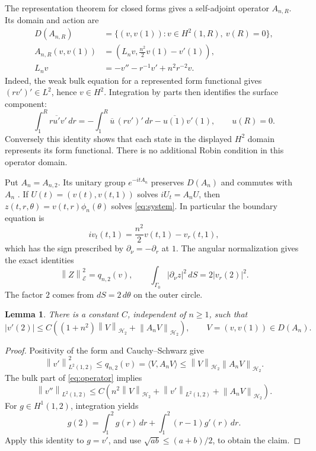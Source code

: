 \documentclass[11pt]{article}
\newtheorem{lemma}[theorem]{Lemma}
\newcommand{\HH}{\mathcal H}
\newcommand{\EE}{\mathcal E}
\newcommand{\norm}[1]{\left\|#1\right\|}
\begin{document}
The representation theorem for closed forms \cite[Theorem 2.14]{Teschl}
gives a self-adjoint operator \(A_{n,R}\). Its domain and action are
\begin{equation}\label{eq:operator}
\begin{split}
D(A_{n,R})&=\{(v,v(1)):v\in H^2(1,R),\ v(R)=0\},\\
A_{n,R}(v,v(1))&=\left(L_nv,\frac{n^2}{2}v(1)-v'(1)\right),\\
L_nv&=-v''-r^{-1}v'+n^2r^{-2}v.
\end{split}
\end{equation}
Indeed, the weak bulk equation for a represented form functional gives
\((rv')'\in L^2\), hence \(v\in H^2\). Integration by parts then identifies
the surface component:
\[
\int_1^R r\overline{u'}v'\,dr
=-\int_1^R\overline u\,(rv')'\,dr-\overline{u(1)}v'(1),
\qquad u(R)=0.
\]
Conversely this identity shows that each state in the displayed \(H^2\)
domain represents its form functional. There is no additional Robin
condition in this operator domain.

Put \(A_n=A_{n,2}\). Its unitary group \(e^{-itA_n}\) preserves \(D(A_n)\)
and commutes with \(A_n\) \cite[Theorem 5.1]{Teschl}. If
\(U(t)=(v(t),v(t,1))\) solves \(iU_t=A_nU\), then
\(z(t,r,\theta)=v(t,r)\phi_n(\theta)\) solves \eqref{eq:system}. In
particular the boundary equation is
\[
i v_t(t,1)=\frac{n^2}{2}v(t,1)-v_r(t,1),
\]
which has the sign prescribed by \(\partial_\nu=-\partial_r\) at \(1\).
The angular normalization gives the exact identities
\begin{equation}\label{eq:normalization}
\norm{Z}_{\EE}^{2}=q_{n,2}(v),\qquad
\int_{\Gamma_0}|\partial_\nu z|^2\,dS=2|v_r(2)|^2.
\end{equation}
The factor \(2\) comes from \(dS=2\,d\theta\) on the outer circle.

\begin{lemma}\label{lem:trace}
There is a constant \(C\), independent of \(n\ge1\), such that
\[
|v'(2)|\le C\left((1+n^2)\norm{V}_{\HH_2}
+\norm{A_nV}_{\HH_2}\right),\qquad V=(v,v(1))\in D(A_n).
\]
\end{lemma}
\begin{proof}
Positivity of the form and Cauchy--Schwarz give
\[
\norm{v'}_{L^2(1,2)}^2\le q_{n,2}(v)
=\langle V,A_nV\rangle
\le\norm{V}_{\HH_2}\norm{A_nV}_{\HH_2}.
\]
The bulk part of \eqref{eq:operator} implies
\[
\norm{v''}_{L^2(1,2)}
\le C\left(n^2\norm{V}_{\HH_2}
+\norm{v'}_{L^2(1,2)}+\norm{A_nV}_{\HH_2}\right).
\]
For \(g\in H^1(1,2)\), integration yields
\[
g(2)=\int_1^2 g(r)\,dr+\int_1^2(r-1)g'(r)\,dr.
\]
Apply this identity to \(g=v'\), and use
\(\sqrt{ab}\le(a+b)/2\), to obtain the claim.
\end{proof}
\end{document}
